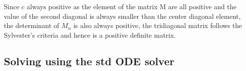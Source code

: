 \documentclass{article}
\begin{document}
Since $c$ always positive as the element of the matrix M are all positive and the value of the second diagonal is always smaller than the center diagonal element, the determinant of $M_n$ is also always positive, the tridiagonal matrix follows the Sylvester's criteria and hence is a positive definite matrix.



\subsection{Solving using the std ODE solver}%
\label{sub:Solving using the std ODE solver}
\end{document}
